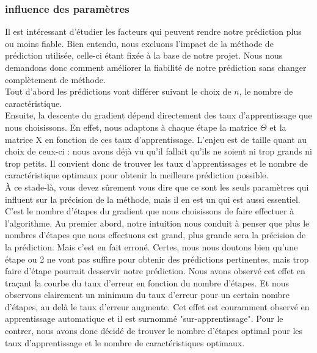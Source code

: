 \documentclass[a4paper,10pt]{article}
\begin{document}
\subsubsection{influence des paramètres}

Il est intéressant d'étudier les facteurs qui peuvent rendre notre prédiction plus ou moins fiable. Bien entendu, nous excluons l'impact de la méthode de prédiction utilisée, celle-ci étant fixée à la base de notre projet. Nous nous demandons donc comment améliorer la fiabilité de notre prédiction sans changer complètement de méthode.\\

Tout d'abord les prédictions vont différer suivant le choix de $n$, le nombre de caractéristique.\\
Ensuite, la descente du gradient dépend directement des taux d'apprentissage que nous choisissons. En effet, nous adaptons à chaque étape la matrice $\Theta$ et la matrice X en fonction de ces taux d'apprentissage. L'enjeu est de taille quant au choix de ceux-ci : nous avons déjà vu qu'il fallait qu'ils ne soient ni trop grands ni trop petits. Il convient donc de trouver les taux d'apprentissages et le nombre de caractéristique optimaux pour obtenir la meilleure prédiction possible.\\
À ce stade-là, vous devez sûrement vous dire que ce sont les seuls paramètres qui influent sur la précision de la méthode, mais il en est un qui est aussi essentiel. C'est le nombre d'étapes du gradient que nous choisissons de faire effectuer à l'algorithme. Au premier abord, notre intuition nous conduit à penser que plus le nombres d'étapes que nous effectuons est grand, plus grande sera la précision de la prédiction. Mais c'est en fait erroné. Certes, nous nous doutons bien qu'une étape ou 2 ne vont pas suffire pour obtenir des prédictions pertinentes, mais trop faire d'étape pourrait desservir notre prédiction. Nous avons observé cet effet en traçant la courbe du taux d'erreur en fonction du nombre d'étapes. Et nous observons clairement un minimum du taux d'erreur pour un certain nombre d'étapes, au delà le taux d'erreur augmente. Cet effet est couramment observé en apprentissage automatique et il est surnommé "sur-apprentissage". Pour le contrer, nous avons donc décidé de trouver le nombre d'étapes optimal pour les taux d'apprentissage et le nombre de caractéristiques optimaux.

\end{document}

